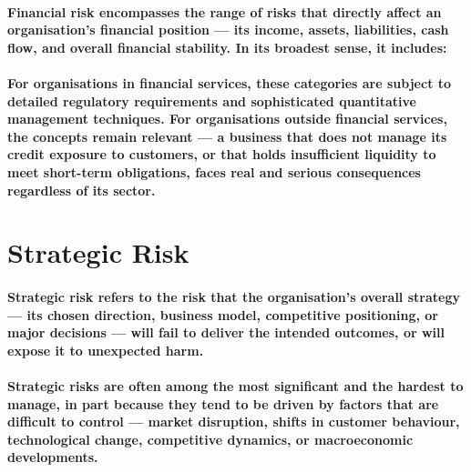 \paragraph{\textbf{Financial risk} encompasses the range of risks that directly affect an organisation's financial position — its income, assets, liabilities, cash flow, and overall financial stability. In its broadest sense, it includes:}
\begin{itemize}
\end{itemize}
\paragraph{For organisations in financial services, these categories are subject to detailed regulatory requirements and sophisticated quantitative management techniques. For organisations outside financial services, the concepts remain relevant — a business that does not manage its credit exposure to customers, or that holds insufficient liquidity to meet short-term obligations, faces real and serious consequences regardless of its sector.}

\section{Strategic Risk}
\paragraph{\textbf{Strategic risk} refers to the risk that the organisation's overall strategy — its chosen direction, business model, competitive positioning, or major decisions — will fail to deliver the intended outcomes, or will expose it to unexpected harm.}
\paragraph{Strategic risks are often among the most significant and the hardest to manage, in part because they tend to be driven by factors that are difficult to control — market disruption, shifts in customer behaviour, technological change, competitive dynamics, or macroeconomic developments.}
